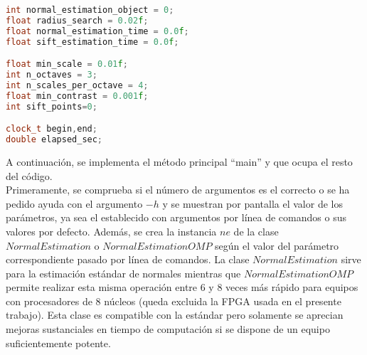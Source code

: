 \begin{lstlisting}[language=C++,breaklines]
int normal_estimation_object = 0;
float radius_search = 0.02f;
float normal_estimation_time = 0.0f;
float sift_estimation_time = 0.0f;

float min_scale = 0.01f;
int n_octaves = 3;
int n_scales_per_octave = 4;
float min_contrast = 0.001f;
int sift_points=0; 

clock_t begin,end;
double elapsed_sec;
\end{lstlisting}

\iffalse
Se implementa ahora el método que muestra ayuda por pantalla que informa sobre cómo utilizar el programa y los posibles parámetros que acepta.

\begin{lstlisting}[language=C++,breaklines]
void 
printUsage (const char* progName)
{
  std::cout << "\n\nUsage: "<<progName<<" [options] <scene.pcd>\n\n"
            << "Options:\n"
            << "-------------------------------------------\n"
            << "-o <integer>	0 for regular normal estimation (default), 1 for enhanced normal estimation\n"
            << "-r <float>	Radius search for normal estimation (default "<< radius_search<<")\n"
            << "-ms <float>	Minimum scale (default " << min_scale << ")\n"
            << "-no <int>	Number of octaves (default " << n_octaves << ")\n"
            << "-ns <int>	Number of scales per octave (default " << n_scales_per_octave << ")\n"
	    	<< "-mc <float>	Minimum contrast (default " << min_contrast << ")\n"
	    	<< "-h		Show help\n"
            << "\n\n";
}
\end{lstlisting}
\fi

A continuación, se implementa el método principal ``main'' y que ocupa el resto del código.\\
Primeramente, se comprueba si el número de argumentos es el correcto o se ha pedido ayuda con el argumento $-h$ y se muestran por pantalla el valor de los parámetros, ya sea el establecido con argumentos por línea de comandos o sus valores por defecto.
Además, se crea la instancia $ne$ de la clase $NormalEstimation$ o $NormalEstimationOMP$ según el valor del parámetro correspondiente pasado por línea de comandos. La clase $NormalEstimation$ sirve para la estimación estándar de normales mientras que $NormalEstimationOMP$ permite realizar esta misma operación entre 6 y 8 veces más rápido para equipos con procesadores de 8 núcleos (queda excluida la FPGA usada en el presente trabajo). Esta clase es compatible con la estándar pero solamente se aprecian mejoras sustanciales en tiempo de computación si se dispone de un equipo suficientemente potente.



